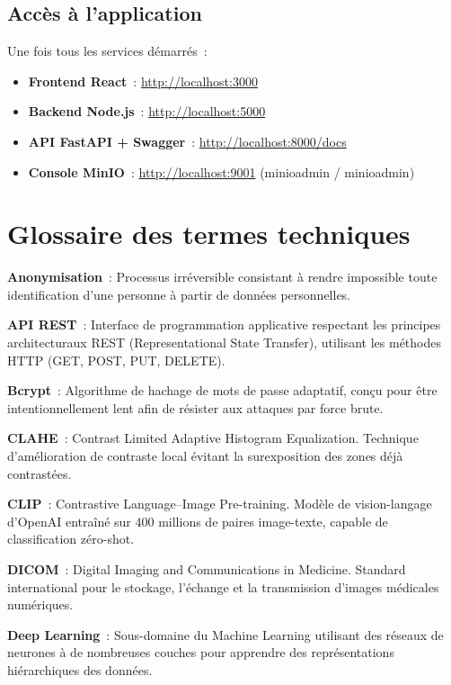 \section{Accès à l'application}

Une fois tous les services démarrés~:

\begin{itemize}
  \item \textbf{Frontend React}~: \url{http://localhost:3000}
  \item \textbf{Backend Node.js}~: \url{http://localhost:5000}
  \item \textbf{API FastAPI + Swagger}~: \url{http://localhost:8000/docs}
  \item \textbf{Console MinIO}~: \url{http://localhost:9001} (minioadmin / minioadmin)
\end{itemize}

\chapter{Glossaire des termes techniques}
\label{annexe:glossaire}

\textbf{Anonymisation}~: Processus irréversible consistant à rendre impossible toute identification d'une personne à partir de données personnelles.

\textbf{API REST}~: Interface de programmation applicative respectant les principes architecturaux REST (Representational State Transfer), utilisant les méthodes HTTP (GET, POST, PUT, DELETE).

\textbf{Bcrypt}~: Algorithme de hachage de mots de passe adaptatif, conçu pour être intentionnellement lent afin de résister aux attaques par force brute.

\textbf{CLAHE}~: Contrast Limited Adaptive Histogram Equalization. Technique d'amélioration de contraste local évitant la surexposition des zones déjà contrastées.

\textbf{CLIP}~: Contrastive Language--Image Pre-training. Modèle de vision-langage d'OpenAI entraîné sur 400 millions de paires image-texte, capable de classification zéro-shot.

\textbf{DICOM}~: Digital Imaging and Communications in Medicine. Standard international pour le stockage, l'échange et la transmission d'images médicales numériques.

\textbf{Deep Learning}~: Sous-domaine du Machine Learning utilisant des réseaux de neurones à de nombreuses couches pour apprendre des représentations hiérarchiques des données.

